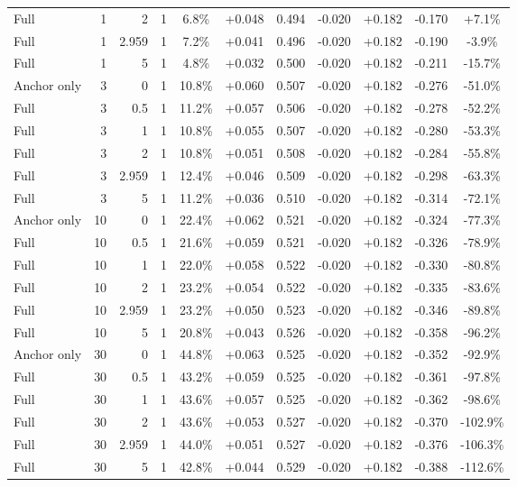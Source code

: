 \begin{table}[htbp]
\begin{tabular}{lrrrccccccc}
Full & 1 & 2 & 1 & 6.8\% & +0.048 & 0.494 & -0.020 & +0.182 & -0.170 & +7.1\% \\
Full & 1 & 2.959 & 1 & 7.2\% & +0.041 & 0.496 & -0.020 & +0.182 & -0.190 & -3.9\% \\
Full & 1 & 5 & 1 & 4.8\% & +0.032 & 0.500 & -0.020 & +0.182 & -0.211 & -15.7\% \\
Anchor only & 3 & 0 & 1 & 10.8\% & +0.060 & 0.507 & -0.020 & +0.182 & -0.276 & -51.0\% \\
Full & 3 & 0.5 & 1 & 11.2\% & +0.057 & 0.506 & -0.020 & +0.182 & -0.278 & -52.2\% \\
Full & 3 & 1 & 1 & 10.8\% & +0.055 & 0.507 & -0.020 & +0.182 & -0.280 & -53.3\% \\
Full & 3 & 2 & 1 & 10.8\% & +0.051 & 0.508 & -0.020 & +0.182 & -0.284 & -55.8\% \\
Full & 3 & 2.959 & 1 & 12.4\% & +0.046 & 0.509 & -0.020 & +0.182 & -0.298 & -63.3\% \\
Full & 3 & 5 & 1 & 11.2\% & +0.036 & 0.510 & -0.020 & +0.182 & -0.314 & -72.1\% \\
Anchor only & 10 & 0 & 1 & 22.4\% & +0.062 & 0.521 & -0.020 & +0.182 & -0.324 & -77.3\% \\
Full & 10 & 0.5 & 1 & 21.6\% & +0.059 & 0.521 & -0.020 & +0.182 & -0.326 & -78.9\% \\
Full & 10 & 1 & 1 & 22.0\% & +0.058 & 0.522 & -0.020 & +0.182 & -0.330 & -80.8\% \\
Full & 10 & 2 & 1 & 23.2\% & +0.054 & 0.522 & -0.020 & +0.182 & -0.335 & -83.6\% \\
Full & 10 & 2.959 & 1 & 23.2\% & +0.050 & 0.523 & -0.020 & +0.182 & -0.346 & -89.8\% \\
Full & 10 & 5 & 1 & 20.8\% & +0.043 & 0.526 & -0.020 & +0.182 & -0.358 & -96.2\% \\
Anchor only & 30 & 0 & 1 & 44.8\% & +0.063 & 0.525 & -0.020 & +0.182 & -0.352 & -92.9\% \\
Full & 30 & 0.5 & 1 & 43.2\% & +0.059 & 0.525 & -0.020 & +0.182 & -0.361 & -97.8\% \\
Full & 30 & 1 & 1 & 43.6\% & +0.057 & 0.525 & -0.020 & +0.182 & -0.362 & -98.6\% \\
Full & 30 & 2 & 1 & 43.6\% & +0.053 & 0.527 & -0.020 & +0.182 & -0.370 & -102.9\% \\
Full & 30 & 2.959 & 1 & 44.0\% & +0.051 & 0.527 & -0.020 & +0.182 & -0.376 & -106.3\% \\
Full & 30 & 5 & 1 & 42.8\% & +0.044 & 0.529 & -0.020 & +0.182 & -0.388 & -112.6\% \\

\end{tabular}
\end{table}

